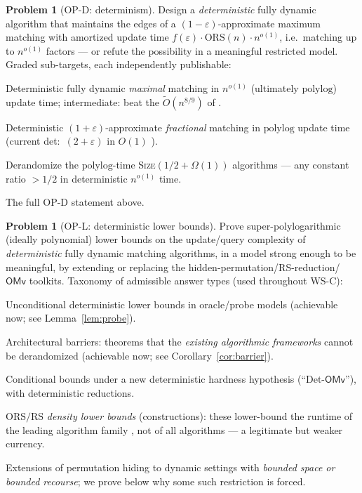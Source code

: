 \documentclass[11pt]{article}
\theoremstyle{definition}
\newtheorem{problem}[theorem]{Problem}
\theoremstyle{remark}
\newcommand{\ORS}{\mathrm{ORS}}
\newcommand{\RS}{\mathrm{RS}}
\newcommand{\polylog}{\mathrm{polylog}}
\newcommand{\OMv}{\mathsf{OMv}}
\newcommand{\eps}{\varepsilon}
\newcommand{\Otil}{\widetilde{O}}
\begin{document}
\begin{problem}[OP-D: determinism]\label{prob:OPD}
Design a \emph{deterministic} fully dynamic algorithm that maintains the
edges of a $(1-\eps)$-approximate maximum matching with amortized update
time $f(\eps)\cdot \ORS(n)\cdot n^{o(1)}$, i.e.\ matching \cite{AKK25} up
to $n^{o(1)}$ factors --- or refute the possibility in a meaningful
restricted model. Graded sub-targets, each independently publishable:
\begin{description}[itemsep=2pt]
\item[D1 (maximal/half).] Deterministic fully dynamic \emph{maximal}
matching in $n^{o(1)}$ (ultimately $\polylog$) update time; intermediate:
beat the $\Otil(n^{8/9})$ of \cite{BBKS25}.
\item[D2 (fractional).] Deterministic $(1+\eps)$-approximate
\emph{fractional} matching in $\polylog$ update time (current det:\
$(2+\eps)$ in $O(1)$ \cite{BCH17}).
\item[D3 (size, better-than-2).] Derandomize the $\polylog$-time
\textsc{Size}$(1/2+\Omega(1))$ algorithms \cite{Beh23,BKSW23,ABR24} ---
any constant ratio $>1/2$ in deterministic $n^{o(1)}$ time.
\item[D4 (ORS-parameterized).] The full OP-D statement above.
\end{description}
\end{problem}

\begin{problem}[OP-L: deterministic lower bounds]\label{prob:OPL}
Prove super-polylogarithmic (ideally polynomial) lower bounds on the
update/query complexity of \emph{deterministic} fully dynamic matching
algorithms, in a model strong enough to be meaningful, by extending or
replacing the hidden-permutation/RS-reduction/$\OMv$ toolkits. Taxonomy
of admissible answer types (used throughout WS-C):
\begin{description}[itemsep=2pt]
\item[L1.] Unconditional deterministic lower bounds in oracle/probe
models (achievable now; see Lemma~\ref{lem:probe}).
\item[L2.] Architectural barriers: theorems that the \emph{existing
algorithmic frameworks} cannot be derandomized (achievable now; see
Corollary~\ref{cor:barrier}).
\item[L3.] Conditional bounds under a new deterministic hardness
hypothesis (``Det-$\OMv$''), with deterministic reductions.
\item[L4.] $\ORS/\RS$ \emph{density lower bounds} (constructions): these
lower-bound the runtime of the leading algorithm family
\cite{BG24,AKK25}, not of all algorithms --- a legitimate but weaker
currency.
\item[L5.] Extensions of permutation hiding \cite{AS23} to dynamic
settings with \emph{bounded space or bounded recourse}; we prove below
why some such restriction is forced.
\end{description}
\end{problem}
\end{document}
